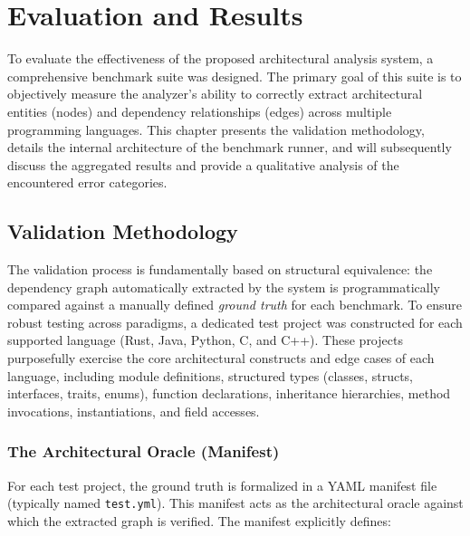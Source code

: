 \chapter{Evaluation and Results}
\label{ch:evaluation_results}

\label{sec:evaluation_introduction}

To evaluate the effectiveness of the proposed architectural analysis
system, a comprehensive benchmark suite was designed. The primary
goal of this suite is to objectively measure the analyzer's ability
to correctly extract architectural entities (nodes) and dependency
relationships (edges) across multiple programming languages. This
chapter presents the validation methodology, details the internal
architecture of the benchmark runner, and will subsequently discuss
the aggregated results and provide a qualitative analysis of the
encountered error categories.

\section{Validation Methodology}
\label{sec:validation_methodology}

The validation process is fundamentally based on structural
equivalence: the dependency graph automatically extracted by the
system is programmatically compared against a manually defined
\textit{ground truth} for each benchmark. To ensure robust testing
across paradigms, a dedicated test project was constructed for each
supported language (Rust, Java, Python, C, and C++). These projects
purposefully exercise the core architectural constructs and edge
cases of each language, including module definitions, structured
types (classes, structs, interfaces, traits, enums), function
declarations, inheritance hierarchies, method invocations,
instantiations, and field accesses.

\subsection{The Architectural Oracle (Manifest)}
For each test project, the ground truth is formalized in a YAML
manifest file (typically named \texttt{test.yml}). This manifest acts
as the architectural oracle against which the extracted graph is
verified. The manifest explicitly defines:

